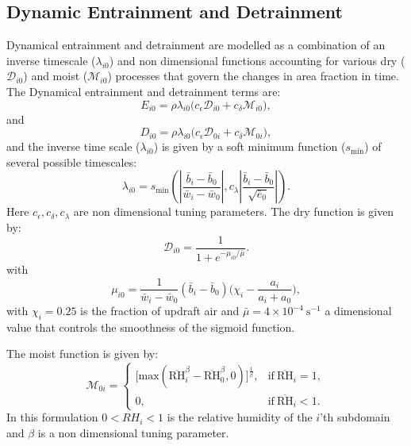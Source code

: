 \documentclass{report}
\begin{document}
\subsection{Dynamic Entrainment and Detrainment} \label{sec:Dynamic Entrainment and Detrainment}
Dynamical entrainment and detrainment are modelled as a combination of an inverse timescale ($\lambda_{i0}$) and non dimensional functions accounting for various dry ($\mathcal{D}_{i0}$) and moist ($\mathcal{M}_{i0}$) processes that govern the changes in area fraction in time. 
The Dynamical entrainment and detrainment terms are:
\begin{equation} \label{eq:fractional_entrainment} 
E_{i0}  = \rho \lambda_{i0} \Bigg( c_{\epsilon} \mathcal{D}_{i0} + c_{\delta}\mathcal{M}_{i0} \Bigg),
\end{equation}
and 
\begin{equation} \label{eq:fractional_detrainment} 
D_{i0} = \rho \lambda_{i0} \Bigg( c_{\epsilon} \mathcal{D}_{0i} + c_{\delta}\mathcal{M}_{0i}\Bigg),
\end{equation}
and the inverse time scale ($\lambda_{i0}$) is given by a soft minimum function ($s_{\min}$) of several possible timescales:
\begin{equation} \label{eq:entrainment_timescale} 
\lambda_{i0} = s_{\min} \left( \left| \frac{\bar{b}_i - \bar{b}_0}{\bar{w}_i - \bar{w}_0} \right|, c_{\lambda} \left| \frac{\bar{b}_i - \bar{b}_0}{\sqrt{\bar{e}_0}} \right| \right).
\end{equation}
Here $c_{\epsilon}, c_{\delta}, c_{\lambda}$ are non dimensional tuning parameters. The dry function is given by:
\begin{equation} \label{eq:entr_sigmoid} 
\mathcal{D}_{i0} = \frac{1}{1+e^{-\mu_{i0}/\bar{\mu}}}.
\end{equation}
with
\begin{equation} \label{eq:mu_ij} 
\mu_{i0} = \frac{1}{\bar{w}_i - \bar{w}_0}(\bar{b}_i - \bar{b}_0)\Big(\chi_i - \frac{a_i}{a_i+a_0} \Big),
\end{equation}
with $\chi_i=0.25$ is the fraction of updraft air and $\bar{\mu}=4 \times 10^{-4}~\textrm{s}^{-1}$ a dimensional value that controls the smoothness of the sigmoid function.

The moist function is given by:
\begin{equation} \label{eq:detr_RH} 
\mathcal{M}_{0i} = \begin{cases}
      \Big[ \textrm{max}(\overline{\mathrm{RH}}_{i}^\beta - \overline{\mathrm{RH}}_0^\beta,0) \Big]^{\frac{1}{\beta}}, & \text{if}\ \overline{\mathrm{RH}}_{i} = 1, \\
      0, & \text{if}\ \overline{\mathrm{RH}}_{i} < 1.
    \end{cases}
\end{equation}
In this formulation $0<RH_i<1$ is the relative humidity of the $i$'th subdomain and $\beta$ is a non dimensional tuning parameter.  
\end{document}

